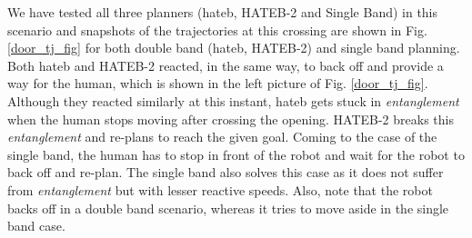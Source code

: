 We have tested all three planners (\acrshort{hateb}, HATEB-2 and Single Band) in this scenario and snapshots of the trajectories at this crossing are shown in Fig. \ref{door_tj_fig} for both double band (\acrshort{hateb}, HATEB-2) and single band planning. Both \acrshort{hateb} and HATEB-2 reacted, in the same way, to back off and provide a way for the human, which is shown in the left picture of Fig. \ref{door_tj_fig}. Although they reacted similarly at this instant, \acrshort{hateb} gets stuck in \textit{entanglement} when the human stops moving after crossing the opening. HATEB-2 breaks this \textit{entanglement} and re-plans to reach the given goal. Coming to the case of the single band, the human has to stop in front of the robot and wait for the robot to back off and re-plan. The single band also solves this case as it does not suffer from \textit{entanglement} but with lesser reactive speeds. Also, note that the robot backs off in a double band scenario, whereas it tries to move aside in the single band case. 

